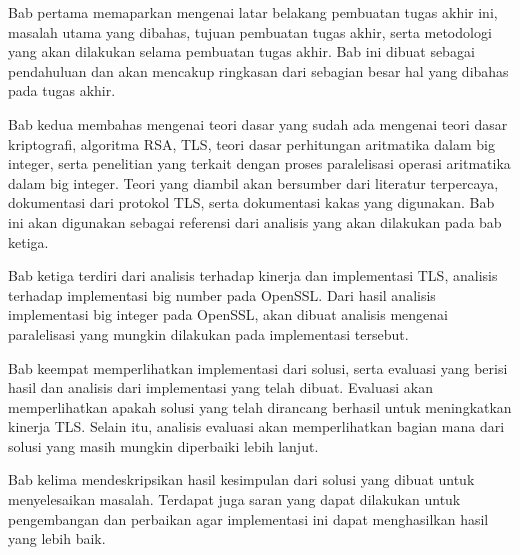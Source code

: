    Bab pertama memaparkan mengenai latar belakang pembuatan tugas akhir ini, masalah utama yang dibahas, tujuan pembuatan tugas akhir, serta metodologi yang akan dilakukan selama pembuatan tugas akhir. Bab ini dibuat sebagai pendahuluan dan akan mencakup ringkasan dari sebagian besar hal yang dibahas pada tugas akhir.

    Bab kedua membahas mengenai teori dasar yang sudah ada mengenai teori dasar kriptografi, algoritma RSA, TLS, teori dasar perhitungan aritmatika dalam big integer, serta penelitian yang terkait dengan proses paralelisasi operasi aritmatika dalam big integer. Teori yang diambil akan bersumber dari literatur terpercaya, dokumentasi dari protokol TLS, serta dokumentasi kakas yang digunakan. Bab ini akan digunakan sebagai referensi dari analisis yang akan dilakukan pada bab ketiga.

    Bab ketiga terdiri dari analisis terhadap kinerja dan implementasi TLS, analisis terhadap implementasi big number pada OpenSSL. Dari hasil analisis implementasi big integer pada OpenSSL, akan dibuat analisis mengenai paralelisasi yang mungkin dilakukan pada implementasi tersebut.

    Bab keempat memperlihatkan implementasi dari solusi, serta evaluasi yang berisi hasil dan analisis dari implementasi yang telah dibuat. Evaluasi akan memperlihatkan apakah solusi yang telah dirancang berhasil untuk meningkatkan kinerja TLS. Selain itu, analisis evaluasi akan memperlihatkan bagian mana dari solusi yang masih mungkin diperbaiki lebih lanjut.

    Bab kelima mendeskripsikan hasil kesimpulan dari solusi yang dibuat untuk menyelesaikan masalah. Terdapat juga saran yang dapat dilakukan untuk pengembangan dan perbaikan agar implementasi ini dapat menghasilkan hasil yang lebih baik.
